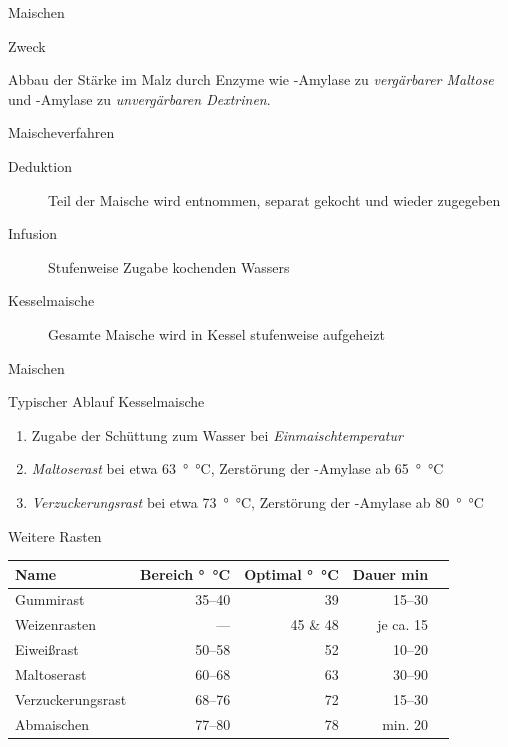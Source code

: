 \documentclass[9pt, ngerman]{beamer}
\begin{document}
\begin{frame}{Maischen}
  \begin{block}{Zweck}
    \vspace{0.5em}

    Abbau der Stärke im Malz durch Enzyme wie \textbeta-Amylase zu
    \emph{vergärbarer Maltose} und \textalpha-Amylase zu \emph{unvergärbaren
    Dextrinen}.

  \end{block}

  \begin{block}{Maischeverfahren}
  	\begin{description}
  		\item[Deduktion] Teil der Maische wird entnommen, separat gekocht und wieder zugegeben
  		\item[Infusion] Stufenweise Zugabe kochenden Wassers
  		\item[Kesselmaische] Gesamte Maische wird in Kessel stufenweise aufgeheizt
  	\end{description}
  \end{block}
\end{frame}
\begin{frame}{Maischen}
  \begin{block}{Typischer Ablauf Kesselmaische}
    \begin{enumerate}
      \item Zugabe der Schüttung zum Wasser bei \emph{Einmaischtemperatur}
      \item \emph{Maltoserast} bei etwa \SI{63}{\degree\celsius}, Zerstörung der
        \textbeta-Amylase ab \SI{65}{\degree\celsius}
      \item \emph{Verzuckerungsrast} bei etwa \SI{73}{\degree\celsius},
        Zerstörung der \textalpha-Amylase ab \SI{80}{\degree\celsius}
    \end{enumerate}
  \end{block}
  \begin{block}{Weitere Rasten}
    \vspace{-0.5em}
    \begin{table}
      \begin{tabular}{lrrrr}
        \textbf{Name} & \textbf{Bereich \si{\degree\celsius}} & \textbf{Optimal \si{\degree\celsius}} & \textbf{Dauer \si{\minute}}\\
        \midrule
        Gummirast           & \numrange{35}{40} & 39        & \numrange{15}{30}\\
        Weizenrasten        & ---               & 45 \& 48  & je ca. 15\\
        Eiweißrast          & \numrange{50}{58} & 52        & \numrange{10}{20}\\
        Maltoserast         & \numrange{60}{68} & 63        & \numrange{30}{90}\\
        Verzuckerungsrast   & \numrange{68}{76} & 72        & \numrange{15}{30}\\
        Abmaischen          & \numrange{77}{80} & 78        & min. 20\\
      \end{tabular}
    \end{table}
  \end{block}
\end{frame}
\end{document}
